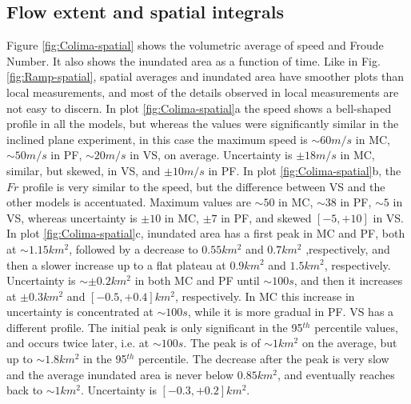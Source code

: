 \documentclass{article}
\begin{document}
\subsection{Flow extent and spatial integrals}
Figure \ref{fig:Colima-spatial} shows the volumetric average of speed and Froude Number. It also shows the inundated area as a function of time. Like in Fig.\ref{fig:Ramp-spatial}, spatial averages and inundated area have smoother plots than local measurements, and most of the details observed in local measurements are not easy to discern. In plot \ref{fig:Colima-spatial}a the speed shows a bell-shaped profile in all the models, but whereas the values were significantly similar in the inclined plane experiment, in this case the maximum speed is $\sim 60 m/s$ in MC, $\sim 50 m/s$ in PF, $\sim 20 m/s$ in VS, on average. Uncertainty is $\pm 18 m/s$ in MC, similar, but skewed, in VS, and $\pm 10 m/s$ in PF. In plot \ref{fig:Colima-spatial}b, the $Fr$ profile is very similar to the speed, but the difference between VS and the other models is accentuated. Maximum values are $\sim 50$ in MC, $\sim 38$ in PF, $\sim 5$ in VS, whereas uncertainty is $\pm 10$ in MC, $\pm 7$ in PF, and skewed $[-5, +10]$ in VS. In plot \ref{fig:Colima-spatial}c, inundated area has a first peak in MC and PF, both at $\sim 1.15 km^2$, followed by a decrease to $0.55 km^2$ and $0.7 km^2$ ,respectively, and then a slower increase up to a flat plateau at $0.9 km^2$ and $1.5 km^2$, respectively. Uncertainty is $\sim \pm 0.2 km^2$ in both MC and PF until $\sim 100 s$, and then it increases at $\pm 0.3 km^2$ and $[-0.5, +0.4] km^2$, respectively. In MC this increase in uncertainty is concentrated at $\sim 100 s$, while it is more gradual in PF. VS has a different profile. The initial peak is only significant in the 95$^{th}$ percentile values, and occurs twice later, i.e. at $\sim 100 s$. The peak is of $\sim 1 km^2$ on the average, but up to $\sim 1.8 km^2$ in the 95$^{th}$ percentile. The decrease after the peak is very slow and the average inundated area is never below $0.85 km^2$, and eventually reaches back to $\sim 1 km^2$. Uncertainty is $[-0.3, +0.2] km^2$.
\end{document}
